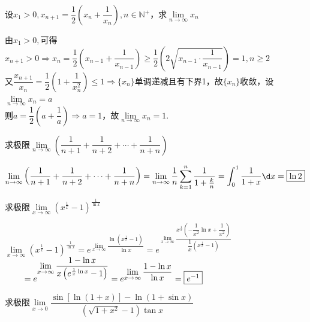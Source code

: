 \documentclass[12pt, a4paper, oneside, UTF8]{ctexbook}
\begin{document}
\begin{exercise}
    设$x_1 > 0,x_{n+1}=\dfrac{1}{2}\left(x_n + \dfrac{1}{x_n}\right),n \in \mathbb{N}^+$，求$\lim\limits_{n \to \infty} x_n$
\end{exercise}
\begin{solution}
    由$x_1 > 0,$可得$x_{n+1} > 0\Rightarrow x_n = \dfrac{1}{2}\left(x_{n-1} + \dfrac{1}{x_{n-1}}\right) \ge \dfrac{1}{2}\left(2\sqrt{x_{n-1} \cdot \dfrac{1}{x_{n-1}}}\right) = 1,n \ge 2$\\
    又$\dfrac{x_{n+1}}{x_n}= \dfrac{1}{2}\left(1 + \dfrac{1}{x_n^2}\right) \le 1 \Rightarrow \{x_n\}$单调递减且有下界1，故$\{x_n\}$收敛，设$\lim\limits_{n \to \infty} x_n = a$\\
    则$a=\dfrac{1}{2}\left(a + \dfrac{1}{a}\right) \Rightarrow a=1$，故$\lim\limits_{n \to \infty} x_n = \boxed{1}$.
\end{solution}
\begin{exercise}
    求极限$\lim\limits_{n \to \infty} \left(\dfrac{1}{n+1}+\dfrac{1}{n+2}+\cdots +\dfrac{1}{n+n}\right)$
\end{exercise}
\begin{solution}
    $\lim\limits_{n \to \infty} \left(\dfrac{1}{n+1}+\dfrac{1}{n+2}+\cdots +\dfrac{1}{n+n}\right)
    =\lim\limits_{n \to \infty} \dfrac{1}{n}\displaystyle\sum_{k=1}^{n}\dfrac{1}{1+\frac{k}{n}}
    =\int_{0}^{1}\dfrac{1}{1+x}\d x = \boxed{\ln 2}$
\end{solution}
\begin{exercise}
    求极限$\lim\limits_{x \to \infty} \left(x^{\frac{1}{x}}-1\right)^{\frac{1}{\ln x}}$
\end{exercise}
\begin{solution}
    $\lim\limits_{x \to \infty} \left(x^{\frac{1}{x}}-1\right)^{\frac{1}{\ln x}}
    =e^{\displaystyle\lim\limits_{x \to \infty} \dfrac{\ln \left(x^{\frac{1}{x}}-1\right)}{\ln x}}
    =e^{\displaystyle\lim\limits_{x \to \infty} \dfrac{x^{\frac{1}{x}}\left(-\dfrac{1}{x^2}\ln x +\dfrac{1}{x^2}\right)}{\dfrac{1}{x}\left(x^{\frac{1}{x}}-1\right)}}$\\[10pt]
    $\text{\qquad}
    =e^{\displaystyle\lim\limits_{x \to \infty}\dfrac{1-\ln x}{x\left(e^{\frac{1}{x}\ln x}-1\right)}}
    =e^{\displaystyle\lim\limits_{x \to \infty}\dfrac{1-\ln x}{\ln x}}
    =\boxed{e^{-1}}$
\end{solution}
\begin{exercise}
    求极限$\lim\limits_{x \to 0}\dfrac{\sin[\ln (1+x)] - \ln(1+\sin x)}{(\sqrt{1+x^2}-1)\tan x}$
\end{exercise}
\end{document}
